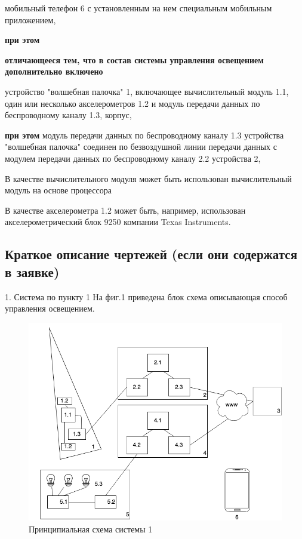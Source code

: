 мобильный телефон 6 с установленным на нем специальным мобильным приложением,

\textbf{при этом}



\textbf{отличающееся тем, что в состав системы управления освещением дополнительно включено}

устройство "волшебная палочка"  1, включающее  вычислительный модуль 1.1,  один или несколько акселерометров 1.2 и модуль передачи данных по беспроводному каналу 1.3, корпус,

\textbf{при этом }
модуль передачи данных по беспроводному каналу 1.3 устройства "волшебная палочка" соединен по безвоздушной линии передачи данных с модулем передачи данных по беспроводному каналу 2.2 устройства 2,

В качестве вычислительного модуля может быть использован вычислительный модуль на основе процессора 

В качестве акселерометра 1.2 может быть, например, использован акселерометрический блок 9250 компании Texas Instruments. 
 

\subsection{Краткое описание чертежей (если они содержатся в заявке)}
1. Система по пункту 1
На фиг.1 приведена блок схема описывающая способ управления освещением.

\begin{figure}[ht]
   \centering
   \includegraphics[scale=.4]{figures/patent-Magget-egor}
    \caption{Принципиальная схема системы 1}
    \label{patent-Magget-egor}
\end{figure}


